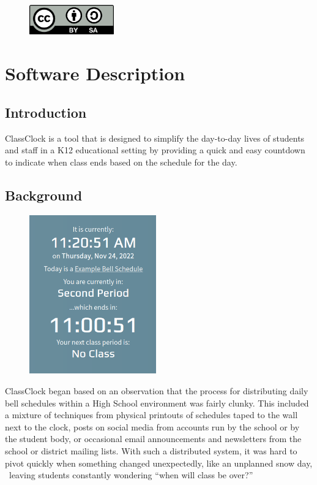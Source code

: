 \documentclass{article}
\begin{document}
\begin{figure}
\includegraphics[width=1.439in,height=0.5043in]{Mini20Manual-img001.png}\end{figure}
\setcounter{tocdepth}{3}
\tableofcontents

\bigskip


\bigskip


\bigskip


\bigskip

\clearpage
\bigskip

\section{Software Description}
\subsection{Introduction}
{
ClassClock is a tool that is designed to simplify the day-to-day lives of students and staff in a K12 educational
setting by providing a quick and easy countdown to indicate when class ends based on the schedule for the day.}

\subsection{Background}
\begin{figure}
\includegraphics[width=2.1575in,height=2.6972in]{Mini20Manual-img002.png}\end{figure}
{
ClassClock began based on an observation that the process for distributing daily bell schedules within a High School
environment was fairly clunky. This included a mixture of techniques from physical printouts of schedules taped to the
wall next to the clock, posts on social media from accounts run by the school or by the student body, or occasional
email announcements and newsletters from the school or district mailing lists. With such a distributed system, it was
hard to pivot quickly when something changed unexpectedly, like an unplanned snow day, \ leaving students constantly
wondering “when will class be over?”}
\end{document}
